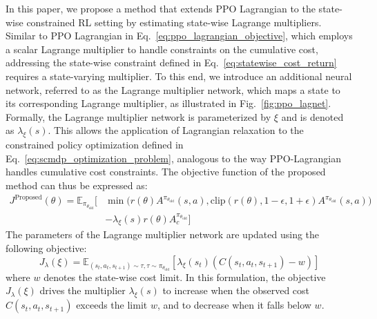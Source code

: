 In this paper, we propose a method that extends PPO Lagrangian to the state-wise constrained RL setting by estimating state-wise Lagrange multipliers.
Similar to PPO Lagrangian in Eq.~\ref{eq:ppo_lagrangian_objective}, which employs a scalar Lagrange multiplier to handle constraints on the cumulative cost, addressing the state-wise constraint defined in Eq.~\ref{eq:statewise_cost_return} requires a state-varying multiplier.
To this end, we introduce an additional neural network, referred to as the Lagrange multiplier network, which maps a state to its corresponding Lagrange multiplier, as illustrated in Fig.~\ref{fig:ppo_lagnet}.
Formally, the Lagrange multiplier network is parameterized by $\xi$ and is denoted as $\lambda_\xi(s)$.
This allows the application of Lagrangian relaxation to the constrained policy optimization defined in Eq.~\ref{eq:scmdp_optimization_problem}, analogous to the way PPO-Lagrangian handles cumulative cost constraints.
The objective function of the proposed method can thus be expressed as:
\begin{equation} 
    \begin{aligned} J^{\text{Proposed}}(\theta) 
        = \mathbb{E}_{\pi_{\theta_\text{old}}} \Big[ &\min \big( r(\theta) A^{\pi_{\theta_\text{old}}}(s, a), \text{clip}(r(\theta), 1 - \epsilon, 1 + \epsilon) A^{\pi_{\theta_\text{old}}}(s, a) \big) 
        \\ &- \lambda_\xi(s) r(\theta) A^{\pi_{\theta_\text{old}}}_c \Big] 
    \end{aligned} 
\end{equation}
The parameters of the Lagrange multiplier network are updated using the following objective:
\begin{equation} \label{eq:lagrange_multiplier_update}
    J_\lambda(\xi) = \mathbb{E}_{(s_t, a_t, s_{t + 1}) \sim \tau, \tau \sim \pi_{\theta_\text{old}}} [\lambda_\xi(s_t) (C(s_t, a_t, s_{t + 1}) - w)]
\end{equation}
where $w$ denotes the state-wise cost limit. 
In this formulation, the objective $J_\lambda(\xi)$ drives the multiplier $\lambda_\xi(s)$ to increase when the observed cost $C(s_t, a_t, s_{t+1})$ exceeds the limit $w$, and to decrease when it falls below $w$.
